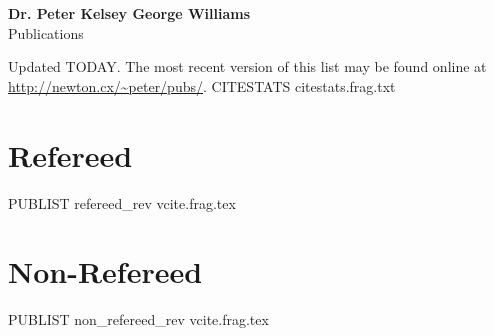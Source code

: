 \documentclass[letterpaper,11pt]{article}
\newenvironment{publist2}{
  \begingroup
  \raggedright
  \begin{description}[leftmargin=4ex,style=sameline]
}{
  \end{description}
  \endgroup
}
\begin{document}
\pagestyle{fancy}
\lhead{} \chead{} \rhead{} \renewcommand{\headrule}{\relax}
\cfoot{\thepage/\pageref*{LastPage}}

\begin{center}
\textbf{\Large Dr. Peter Kelsey George Williams} \\
{\large Publications}
\end{center}

\noindent Updated
TODAY.
The most recent version of this list may be found online at
\url{http://newton.cx/~peter/pubs/}.
CITESTATS citestats.frag.txt

\section*{Refereed}

\begin{publist2}
PUBLIST refereed_rev vcite.frag.tex
\end{publist2}

\section*{Non-Refereed}

\begin{publist2}
PUBLIST non_refereed_rev vcite.frag.tex
\end{publist2}
\end{document}
